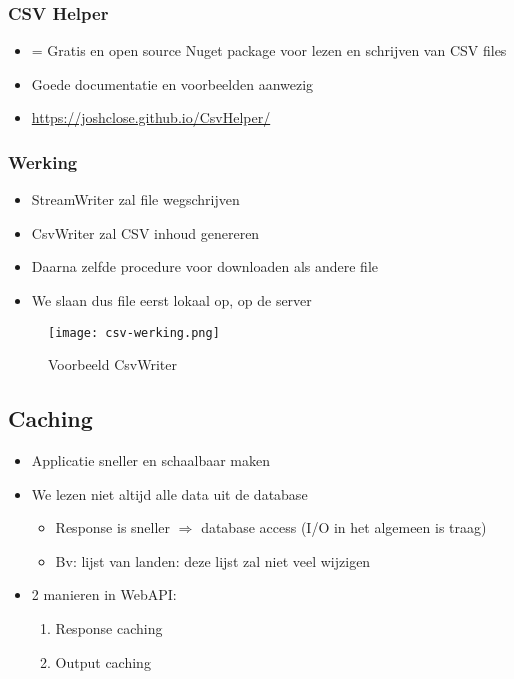 \documentclass{article}
\begin{document}
\subsubsection{CSV Helper}

\begin{itemize}
    \item = Gratis en open source Nuget package voor lezen en schrijven van CSV files
    \item Goede documentatie en voorbeelden aanwezig
    \item \url{https://joshclose.github.io/CsvHelper/}
\end{itemize}

\subsubsection{Werking}

\begin{itemize}
    \item StreamWriter zal file wegschrijven
    \item CsvWriter zal CSV inhoud genereren
    \item Daarna zelfde procedure voor downloaden als andere file
    \item We slaan dus file eerst lokaal op, op de server
\end{itemize}

\begin{figure}[H]
    \centering
    \texttt{[image: csv-werking.png]}
    \caption{Voorbeeld CsvWriter}
\end{figure}

\subsection{Caching}

\begin{itemize}
    \item Applicatie sneller en schaalbaar maken
    \item We lezen niet altijd alle data uit de database
    \begin{itemize}
        \item Response is sneller $\Rightarrow$ database access (I/O in het algemeen is traag)
        \item Bv: lijst van landen: deze lijst zal niet veel wijzigen
    \end{itemize}
    \item 2 manieren in WebAPI:
    \begin{enumerate}
        \item Response caching
        \item Output caching
    \end{enumerate}
\end{itemize}
\end{document}
